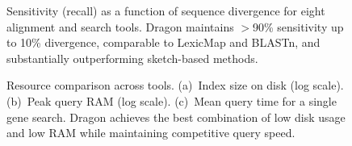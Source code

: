 \documentclass[11pt]{article}
\begin{document}
\begin{figure}[h]
\centering
{}
\caption{Sensitivity (recall) as a function of sequence divergence for eight alignment and search tools. Dragon maintains $>$90\% sensitivity up to 10\% divergence, comparable to LexicMap and BLASTn, and substantially outperforming sketch-based methods.}
\label{fig:sensitivity}
\end{figure}

\begin{figure}[h]
\centering
{}
\caption{Resource comparison across tools. (a)~Index size on disk (log scale). (b)~Peak query RAM (log scale). (c)~Mean query time for a single gene search. Dragon achieves the best combination of low disk usage and low RAM while maintaining competitive query speed.}
\label{fig:resources}
\end{figure}
\end{document}
